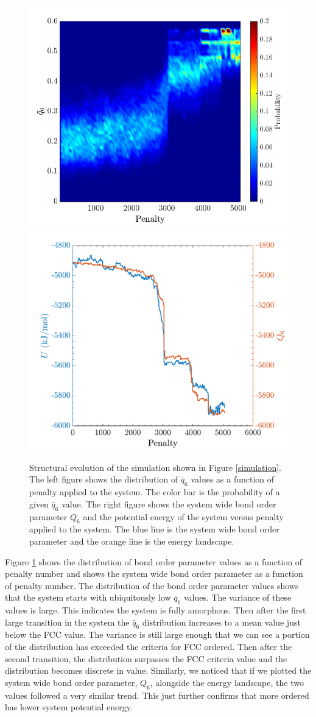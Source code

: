 \begin{figure}[h]
	\centering
	\includegraphics[width=.45\textwidth]{./Figures/Nucleation/high_density/heatplot_bar.png}
	\hspace{.03\textwidth}
	\includegraphics[width=.45\textwidth]{./Figures/Nucleation/high_density/Q6_landscape.pdf}
	\caption{Structural evolution of the simulation shown in Figure \ref{simulation}.  The left figure shows the distribution of $\bar{q}_6$ values as a function of penalty applied to the system.  The color bar is the probability of a given $\bar{q}_6$ value.  The right figure shows the system wide bond order parameter $Q_6$ and the potential energy of the system versus penalty applied to the system.  The blue line is the system wide bond order parameter and the orange line is the energy landscape.}
	\label{structure}
\end{figure}

Figure \ref{structure} shows the distribution of bond order parameter values as a function of penalty number and shows the system wide bond order parameter as a function of penalty number.  The distribution of the bond order parameter values shows that the system starts with ubiquitously low $\bar{q}_6$ values.  The variance of these values is large.  This indicates the system is fully amorphous.  Then after the first large transition in the system the $\bar{q}_6$ distribution increases to a mean value just below the FCC value.  The variance is still large enough that we can see a portion of the distribution has exceeded the criteria for FCC ordered.  Then after the second transition, the distribution surpasses the FCC criteria value and the distribution becomes discrete in value.  Similarly, we noticed that if we plotted the system wide bond order parameter, $Q_6$, alongside the energy landscape, the two values followed a very similar trend.  This just further confirms that more ordered has lower system potential energy.

